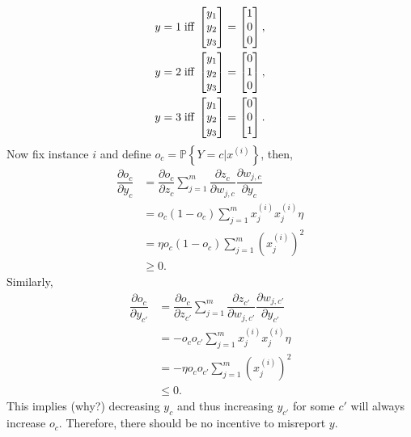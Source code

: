 \documentclass{article}
\begin{document}
\begin{align*}
y  &= 1 \text{\;iff\;} \begin{bmatrix} y_{1} \\ y_{2} \\ y_{3} \end{bmatrix} = \begin{bmatrix} 1 \\ 0 \\ 0 \end{bmatrix} ,
\\ y  &= 2 \text{\;iff\;} \begin{bmatrix} y_{1} \\ y_{2} \\ y_{3} \end{bmatrix} = \begin{bmatrix} 0 \\ 1 \\ 0 \end{bmatrix} ,
\\ y  &= 3 \text{\;iff\;} \begin{bmatrix} y_{1} \\ y_{2} \\ y_{3} \end{bmatrix} = \begin{bmatrix} 0 \\ 0 \\ 1 \end{bmatrix} .
\end{align*}
Now fix instance $i $ and define $o_{c} = \mathbb{P}\left\{Y = c | x^{\left(i\right)}\right\}$, then,
\begin{align*}
\dfrac{\partial o_{c}}{\partial y_{c}} &= \dfrac{\partial o_{c}}{\partial z_{c}} \displaystyle\sum_{j=1}^{m} \dfrac{\partial z_{c}}{\partial w_{j,c}} \dfrac{\partial w_{j,c}}{\partial y_{c}}
\\ &= o_{c} \left(1 - o_{c}\right) \displaystyle\sum_{j=1}^{m} x_{j}^{\left(i\right)} x_{j}^{\left(i\right)} \eta
\\ &= \eta o_{c} \left(1 - o_{c}\right) \displaystyle\sum_{j=1}^{m} \left(x_{j}^{\left(i\right)}\right)^{2}
\\ &\geq  0.
\end{align*}
Similarly,
\begin{align*}
\dfrac{\partial o_{c}}{\partial y_{c'}} &= \dfrac{\partial o_{c}}{\partial z_{c'}} \displaystyle\sum_{j=1}^{m} \dfrac{\partial z_{c'}}{\partial w_{j,c'}} \dfrac{\partial w_{j,c'}}{\partial y_{c'}}
\\ &= - o_{c} o_{c'} \displaystyle\sum_{j=1}^{m} x_{j}^{\left(i\right)} x_{j}^{\left(i\right)} \eta
\\ &= - \eta o_{c} o_{c'} \displaystyle\sum_{j=1}^{m} \left(x_{j}^{\left(i\right)}\right)^{2}
\\ &\leq  0.
\end{align*}
This implies (why?) decreasing $y_{c}$ and thus increasing $y_{c'}$ for some $c'$ will always increase $o_{c}$. Therefore, there should be no incentive to misreport $y. $
\newline \newline
\end{document}
